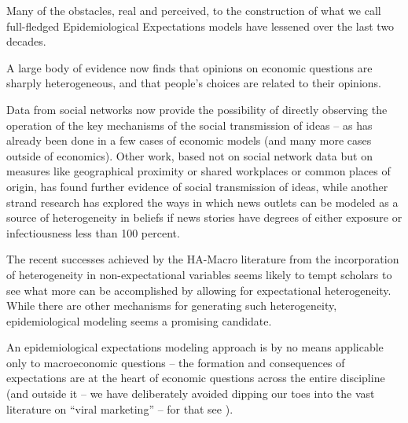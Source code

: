 
\label{conclusion}%


Many of the obstacles, real and perceived, to the construction of what we call
full-fledged Epidemiological Expectations models have lessened over the last two decades.

A large body of evidence now finds that opinions on economic questions are sharply heterogeneous, and that people's choices are related to their opinions.

Data from social networks now provide the possibility of directly observing the operation of the key mechanisms of the social transmission of ideas -- as  has already been done in a few cases of economic models (and many more cases outside of economics).  Other work, based not on social network data but on measures like geographical proximity or shared workplaces or common places of origin, has found further evidence of social transmission of ideas, while another strand research has explored the ways in which news outlets can be modeled as a source of heterogeneity in beliefs if news stories have degrees of either exposure or infectiousness less than 100 percent.

The recent successes achieved by the HA-Macro literature from the incorporation of heterogeneity in non-expectational variables seems likely to tempt scholars to see what more can be accomplished by allowing for expectational heterogeneity.  While there are other mechanisms for generating such heterogeneity, epidemiological modeling seems a promising candidate.

An epidemiological expectations modeling approach is by no means applicable only to macroeconomic questions -- the formation and consequences of expectations are at the heart of economic questions across the entire discipline (and outside it -- we have deliberately avoided dipping our toes into the vast literature on ``viral marketing'' -- for that see \cite{watts2007viral}).

\begin{comment}
\begin{itemize}
	\item Future directions of research
	\begin{itemize}
		\item Better measurements of market expectations/beliefs that could be fit into epi models.
		\begin{itemize}
			\item Explicitly eliciting people's source of information and reasons for held beliefs could shed light on the role of social connections on expectation formation.
		\end{itemize}
		\item Integrating observed social structure and interpersonal interactions with belief surveys to identify the epi models of expectations.
		\item Incorporating epi models of expectations into structural/general equilibrium models to examine if the belief dynamics has important implications for aggregate dynamics and outcomes
	\end{itemize}
\end{itemize}
\end{comment}
